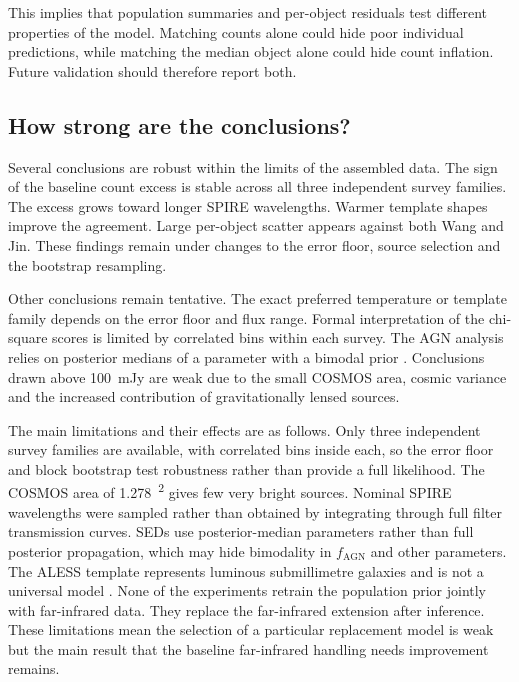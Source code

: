 \documentclass[12pt,a4paper]{article}
\begin{document}
This implies that population summaries and per-object residuals test different
properties of the model. Matching counts alone could hide poor individual predictions,
while matching the median object alone could hide count inflation. Future validation
should therefore report both.

\subsection{How strong are the conclusions?}
\label{sec:discussion:strength}

Several conclusions are robust within the limits of the assembled data. The sign of the baseline count excess is stable across
all three independent survey families. The excess grows toward longer SPIRE wavelengths.
Warmer template shapes improve the agreement. Large per-object scatter appears against
both Wang and Jin. These findings remain under changes to the error floor, source selection and
the bootstrap resampling.

Other conclusions remain tentative. The exact preferred temperature or template family
depends on the error floor and flux range. Formal interpretation of the chi-square scores
is limited by correlated bins within each survey. The AGN analysis relies on posterior
medians of a parameter with a bimodal prior
\citep{Thorp_2025_insights}. Conclusions drawn above \SI{100}{mJy} are weak due to the
small COSMOS area, cosmic variance and the increased contribution of gravitationally
lensed sources.

The main limitations and their effects are as follows. Only three independent survey
families are available, with correlated bins inside each, so the error floor and block
bootstrap test robustness rather than provide a full likelihood. The COSMOS area of
\SI{1.278}{\deg\squared} gives few very bright sources. Nominal SPIRE wavelengths were
sampled rather than obtained by integrating through full filter transmission curves. SEDs use
posterior-median parameters rather than full posterior propagation, which may hide
bimodality in $f_\mathrm{AGN}$ and other parameters. The ALESS template represents
luminous submillimetre galaxies and is not a universal model
  \citep{daCunha_2015}. None of the experiments retrain the population prior jointly
  with far-infrared data. They replace the far-infrared extension after
inference. These limitations mean the selection of a particular replacement model is weak but the main result that the baseline far-infrared handling needs improvement remains.
\end{document}
